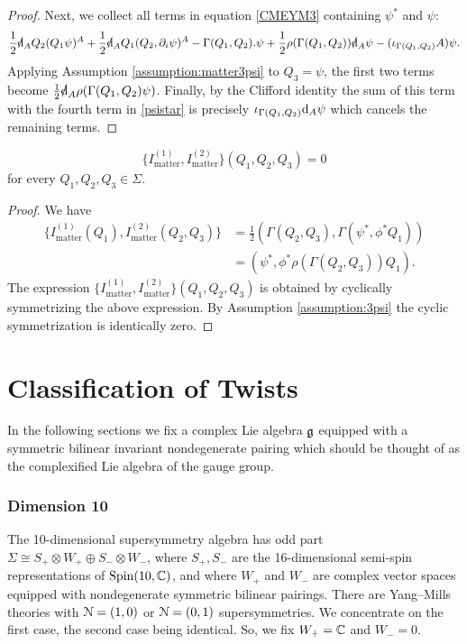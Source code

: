 \documentclass[10pt, oneside]{article}
\newcommand{\matter}{\mathrm{matter}}
\begin{document}
\begin{proof}
Next, we collect all terms in equation \eqref{CMEYM3} containing $\psi^*$ and $\psi$:
\begin{equation}\label{psistar}
\frac{1}{2} \sd \d_A Q_2(Q_1 \psi)^A + \frac{1}{2} \sd \d_A Q_1(Q_2, \partial_i\psi)^A - \Gamma(Q_1,Q_2) . \psi + \frac{1}{2} \rho(\Gamma(Q_1,Q_2)) \sd \d_A \psi - (\iota_{\Gamma(Q_1, Q_2)} A)\psi.
\end{equation}
Applying Assumption \ref{assumption:matter3psi} to $Q_3 = \psi$, the first two terms become $\frac{1}{2} \sd \d_A \rho(\Gamma(Q_1,Q_2) \psi)$. 
Finally, by the Clifford identity the sum of this term with the fourth term in \eqref{psistar} is precisely $\iota_{\Gamma(Q_1,Q_2)}{\rm d}_A \psi$ which cancels the remaining terms.
\end{proof}

\begin{lemma}
\[\{I_{\matter}^{(1)}, I_{\matter}^{(2)}\}(Q_1, Q_2, Q_3) = 0\]
for every $Q_1, Q_2, Q_3\in \Sigma$.
\end{lemma}
\begin{proof}
We have
\begin{align*}
\{I_{\matter}^{(1)}(Q_1), I_{\matter}^{(2)}(Q_2, Q_3)\} & = \frac{1}{2} (\Gamma(Q_2, Q_3), \Gamma(\psi^*, \phi^* Q_1)) \\ & = (\psi^*, \phi^* \rho(\Gamma(Q_2,Q_3)) Q_1)  .
\end{align*}
The expression
$\{I_{\matter}^{(1)}, I_{\matter}^{(2)}\}(Q_1,Q_2,Q_3)$ is obtained by cyclically symmetrizing the above expression. By Assumption \ref{assumption:3psi} the cyclic symmetrization is identically zero.
\end{proof}

\part{Classification of Twists} \label{classification_part}

In the following sections we fix a complex Lie algebra $\mathfrak g$ equipped with a symmetric bilinear invariant nondegenerate pairing which should be thought of as the complexified Lie algebra of the gauge group.

\section{Dimension 10}

The 10-dimensional supersymmetry algebra has odd part $\Sigma\cong S_+\otimes W_+\oplus S_-\otimes W_-$, where $S_+, S_-$ are the 16-dimensional semi-spin representations of $\mathrm{Spin}(10, \mathbb C)$, and where $W_+$ and $W_-$ are complex vector spaces equipped with nondegenerate symmetric bilinear pairings. There are Yang--Mills theories with $\mathcal N=(1, 0)$ or $\mathcal N=(0, 1)$ supersymmetries. We concentrate on the first case, the second case being identical. So, we fix $W_+=\mathbb C$ and $W_- = 0$.
\end{document}
